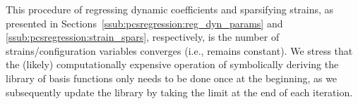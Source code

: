 
This procedure of regressing dynamic coefficients and sparsifying strains, as presented in Sections~\ref{ssub:pcsregression:reg_dyn_params} and \ref{ssub:pcsregression:strain_spars}, respectively, is the number of strains/configuration variables converges (i.e., remains constant). We stress that the (likely) computationally expensive operation of symbolically deriving the library of basis functions only needs to be done once at the beginning, as we subsequently update the library by taking the limit at the end of each iteration.

